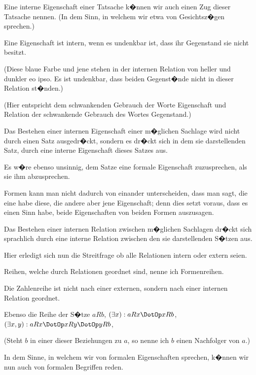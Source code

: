 \begin{propositions}
{Eine interne Eigenschaft einer Tatsache k�nnen
wir auch einen Zug dieser Tatsache nennen. (In
dem Sinn, in welchem wir etwa von Gesichtsz�gen
sprechen.)}


{Eine Eigenschaft ist intern, wenn es undenkbar
ist, dass ihr Gegenstand sie nicht besitzt.

(Diese blaue Farbe und jene stehen in der
internen Relation von heller und dunkler eo ipso.
Es ist undenkbar, dass  beiden Gegenst�nde
nicht in dieser Relation st�nden.)

(Hier entspricht dem schwankenden Gebrauch
der Worte \glqq{}Eigenschaft\grqq{} und \glqq{}Relation\grqq{} der
schwankende Gebrauch des Wortes \glqq{}Gegenstand\grqq{}.)}


{Das Bestehen einer internen Eigenschaft einer
m�glichen Sachlage wird nicht durch einen Satz
ausgedr�ckt, sondern es dr�ckt sich in dem sie
darstellenden Satz, durch eine interne Eigenschaft
dieses Satzes aus.

Es w�re ebenso unsinnig, dem Satze eine
formale Eigenschaft zuzusprechen, als sie ihm
abzusprechen.}


{Formen kann man nicht dadurch von einander
unterscheiden, dass man sagt, die eine habe diese,
die andere aber jene Eigenschaft; denn dies setzt
voraus, dass es einen Sinn habe, beide Eigenschaften
von beiden Formen auszusagen.}


{Das Bestehen einer internen Relation zwischen
m�glichen Sachlagen dr�ckt sich sprachlich durch
eine interne Relation zwischen den sie darstellenden
S�tzen aus.}


{Hier erledigt sich nun die Streitfrage \glqq{}ob alle
Relationen intern oder extern\grqq{} seien.}


{Reihen, welche durch  Relationen
geordnet sind, nenne ich Formenreihen.

Die Zahlenreihe ist nicht nach einer externen,
sondern nach einer internen Relation geordnet.

{\stretchyspace
Ebenso die Reihe der S�tze \glqq{}$aRb$\grqq{},
\glqq{}$(\exists x): aRx \DotOp xRb$\grqq{},
\glqq{}$(\exists x,y): aRx \DotOp xRy \DotOp yRb$\grqq{}, \undSoFort}

(Steht $b$ in einer dieser Beziehungen zu $a$, so
nenne ich $b$ einen Nachfolger von $a$.)}


{In dem Sinne, in welchem wir von formalen
Eigenschaften sprechen, k�nnen wir nun auch
von formalen Begriffen reden.

}
\end{propositions}
